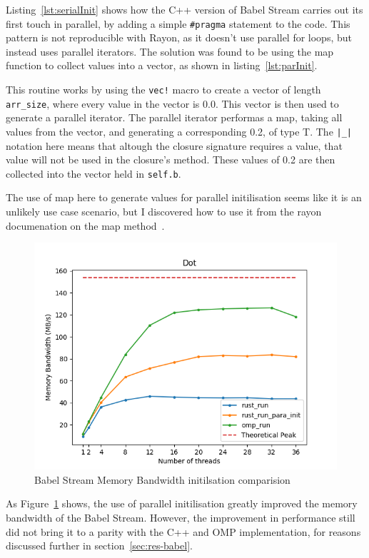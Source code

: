 Listing~\ref{lst:serialInit} shows how the C++ version of Babel Stream carries out its first touch in parallel, by adding a simple \texttt{\#pragma} statement to the code. This pattern is not reproducible with Rayon, as it doesn't use parallel for loops, but instead uses parallel iterators. The solution was found to be using the map function to collect values into a vector, as shown in listing~\ref{lst:parInit}.

This routine works by using the \texttt{vec!} macro to create a vector of length \texttt{arr\_size}, where every value in the vector is 0.0. This vector is then used to generate a parallel iterator. The parallel iterator performas a map, taking all values from the vector, and generating a corresponding 0.2, of type T. The \texttt{|\_|} notation here means that altough the closure signature requires a value, that value will not be used in the closure's method.
These values of 0.2 are then collected into the vector held in \texttt{self.b}.

The use of map here to generate values for parallel initilisation seems like it is an unlikely use case scenario, but I discovered how to use it from the rayon documenation on the map method~\cite{rayonMap}.

\begin{figure}[h]
    \centering
    \includegraphics[width=.8\linewidth]{figs/babel/dot-init.png}
    \caption{Babel Stream Memory Bandwidth initilsation comparision}
    \label{fig:babel-dot-init}
\end{figure}
As Figure~\ref{fig:babel-dot-init} shows, the use of parallel initilisation greatly improved the memory bandwidth of the Babel Stream. However, the improvement in performance still did not bring it to a parity with the C++ and OMP implementation, for reasons discussed further in section~\ref{sec:res-babel}.

